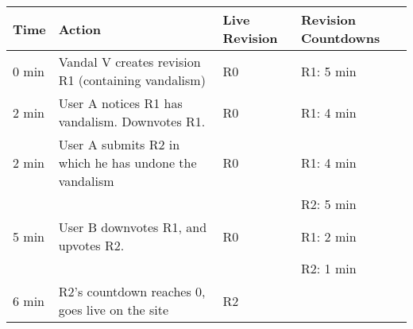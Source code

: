 \begin{tabular}{l|l|l|l}\hline
\textbf{Time} & \textbf{Action} & \textbf{Live Revision} & \textbf{Revision Countdowns} \\
\hline
0 min & Vandal V creates revision R1 (containing vandalism) & R0 & R1: 5 min \\
\hline
2 min & User A notices R1 has vandalism. Downvotes R1. & R0 & R1: 4 min \\
\hline
2 min & User A submits R2 in which he has undone the vandalism & R0 & R1: 4 min \\
 & & & R2: 5 min \\
\hline
5 min & User B downvotes R1, and upvotes R2. & R0 & R1: 2 min \\
 & & & R2: 1 min \\
\hline
6 min & R2's countdown reaches 0, goes live on the site & R2 &  \\
\hline
\end{tabular}
